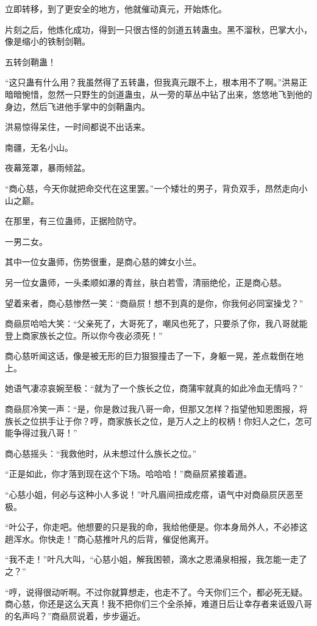 \begin{this_body}
立即转移，到了更安全的地方，他就催动真元，开始炼化。

片刻之后，他炼化成功，得到一只很古怪的剑道五转蛊虫。黑不溜秋，巴掌大小，像是缩小的铁制剑鞘。

五转剑鞘蛊！

“这只蛊有什么用？我虽然得了五转蛊，但我真元跟不上，根本用不了啊。”洪易正暗暗惋惜，忽然一只野生的剑道蛊虫，从一旁的草丛中钻了出来，悠悠地飞到他的身边，然后飞进他手掌中的剑鞘蛊内。

洪易惊得呆住，一时间都说不出话来。

南疆，无名小山。

夜幕笼罩，暴雨倾盆。

“商心慈，今天你就把命交代在这里罢。”一个矮壮的男子，背负双手，昂然走向小山之巅。

在那里，有三位蛊师，正据险防守。

一男二女。

其中一位女蛊师，伤势很重，是商心慈的婢女小兰。

另一位女蛊师，一头柔顺如瀑的青丝，肤白若雪，清丽绝伦，正是商心慈。

望着来者，商心慈惨然一笑：“商赑屃！想不到真的是你，你我何必同室操戈？”

商赑屃哈哈大笑：“父亲死了，大哥死了，嘲风也死了，只要杀了你，我八哥就能登上商家族长之位。所以你今夜必须死！”

商心慈听闻这话，像是被无形的巨力狠狠撞击了一下，身躯一晃，差点栽倒在地上。

她语气凄凉哀婉至极：“就为了一个族长之位，商蒲牢就真的如此冷血无情吗？”

商赑屃冷笑一声：“是，你是救过我八哥一命，但那又怎样？指望他知恩图报，将族长之位拱手让于你？哼，商家族长之位，是万人之上的权柄！你妇人之仁，怎可能争得过我八哥！”

商心慈摇头：“我救他时，从未想过什么族长之位。”

“正是如此，你才落到现在这个下场。哈哈哈！”商赑屃紧接着道。

“心慈小姐，何必与这种小人多说！”叶凡眉间扭成疙瘩，语气中对商赑屃厌恶至极。

“叶公子，你走吧。他想要的只是我的命，我给他便是。你本身局外人，不必掺这趟浑水。你快走！”商心慈推叶凡的后背，催促他离开。

“我不走！”叶凡大叫，“心慈小姐，解我困顿，滴水之恩涌泉相报，我怎能一走了之？”

“哼，说得很动听啊。不过你就算想走，也走不了。今天你们三个，都必死无疑。商心慈，你还是这么天真！我不把你们三个全杀掉，难道日后让幸存者来诋毁八哥的名声吗？”商赑屃说着，步步逼近。


\end{this_body}
